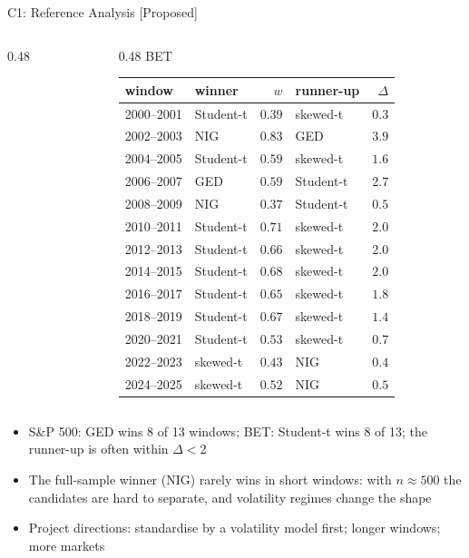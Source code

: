 \begin{frame}{C1: Reference Analysis [Proposed]}
\begin{columns}[T]
\begin{column}{0.48\textwidth}
\end{column}
\begin{column}{0.48\textwidth}
\centering BET\begin{center}
\tiny
\begin{tabular}{llrlr}
\toprule
window & winner & $w$ & runner-up & $\Delta$ \\
\midrule
2000--2001 & Student-t & $0.39$ & skewed-t & $0.3$ \\
2002--2003 & NIG & $0.83$ & GED & $3.9$ \\
2004--2005 & Student-t & $0.59$ & skewed-t & $1.6$ \\
2006--2007 & GED & $0.59$ & Student-t & $2.7$ \\
2008--2009 & NIG & $0.37$ & Student-t & $0.5$ \\
2010--2011 & Student-t & $0.71$ & skewed-t & $2.0$ \\
2012--2013 & Student-t & $0.66$ & skewed-t & $2.0$ \\
2014--2015 & Student-t & $0.68$ & skewed-t & $2.0$ \\
2016--2017 & Student-t & $0.65$ & skewed-t & $1.8$ \\
2018--2019 & Student-t & $0.67$ & skewed-t & $1.4$ \\
2020--2021 & Student-t & $0.53$ & skewed-t & $0.7$ \\
2022--2023 & skewed-t & $0.43$ & NIG & $0.4$ \\
2024--2025 & skewed-t & $0.52$ & NIG & $0.5$ \\
\bottomrule
\end{tabular}
\end{center}

\end{column}
\end{columns}\begin{itemize}
    \item S\&P 500: GED wins 8 of 13 windows; BET: Student-t wins 8 of 13; the runner-up is often within $\Delta < 2$
    \item The full-sample winner (NIG) rarely wins in short windows: with $n \approx 500$ the candidates are hard to separate, and volatility regimes change the shape
    \item Project directions: standardise by a volatility model first; longer windows; more markets
\end{itemize}
\end{frame}
\fi

